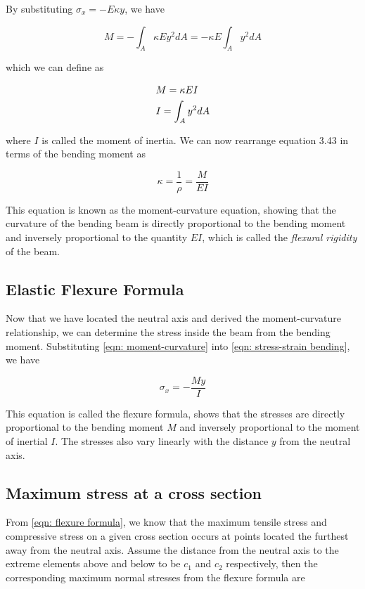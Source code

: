 \documentclass[a4paper,openany,12pt]{book}
\begin{document}
By substituting \(\sigma_x = -E\kappa y\), we have

$$M =  - \int_A \kappa Ey^2dA  =  - \kappa E\int_A y^2dA$$

which we can define as

$$\begin{gathered}
  M = \kappa EI \hfill \\
  I = \int_A y^2dA  \hfill \\ 
\end{gathered}$$

where \(I\) is called the moment of inertia. We can now rearrange equation
3.43 in terms of the bending moment as

$$ \kappa  = \frac{1}{\rho } = \frac{M}{EI}$$

This equation is known as the moment-curvature equation, showing that
the curvature of the bending beam is directly proportional to the
bending moment and inversely proportional to the quantity \(EI\), which is
called the \emph{flexural rigidity} of the beam.

\subsection{Elastic Flexure Formula}
\label{elastic-flexure-formula}
Now that we have located the neutral axis and derived the
moment-curvature relationship, we can determine the stress inside the
beam from the bending moment. Substituting
\ref{eqn: moment-curvature} into
\ref{eqn: stress-strain bending}, we have

$$ \sigma_x =  - \frac{My}{I}$$

This equation is called the flexure formula, shows that the stresses are
directly proportional to the bending moment \(M\) and inversely
proportional to the moment of inertial \(I\). The stresses also vary
linearly with the distance \(y\) from the neutral axis.

\subsection{Maximum stress at a cross section}
\label{maximum-stress-at-a-cross-section}
From \ref{eqn: flexure formula}, we know that the
maximum tensile stress and compressive stress on a given cross section
occurs at points located the furthest away from the neutral axis. Assume
the distance from the neutral axis to the extreme elements above and
below to be \(c_1\) and \(c_2\) respectively, then the corresponding maximum
normal stresses from the flexure formula are
\end{document}
